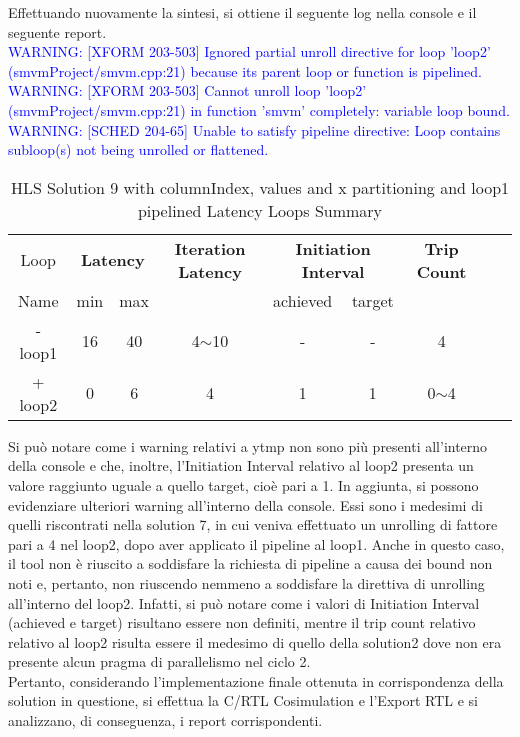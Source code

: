 

Effettuando nuovamente la sintesi, si ottiene il seguente log nella console e il seguente report.
\\
\textcolor{blue}{WARNING: [XFORM 203-503] Ignored partial unroll directive for loop 'loop2' (smvmProject/smvm.cpp:21) because its parent loop or function is pipelined.}
\\
\textcolor{blue}{WARNING: [XFORM 203-503] Cannot unroll loop 'loop2' (smvmProject/smvm.cpp:21) in function 'smvm' completely: variable loop bound.}
\\
\textcolor{blue}{WARNING: [SCHED 204-65] Unable to satisfy pipeline directive: Loop contains subloop(s) not being unrolled or flattened.}
\\
\begin{table}[H]
	\centering
	\begin{tabular}{|c|c|c|c|c|c|c|c|c|}
		\hline
		\multicolumn{1}{|c|}{Loop} & \multicolumn{2}{|c|}{\textbf{Latency}} & \multicolumn{1}{c|}{\textbf{Iteration Latency}} & \multicolumn{2}{c|}{\textbf{Initiation Interval}} & \multicolumn{1}{c|}{\textbf{Trip Count}}  \\
		Name & min & max &  & achieved & target &  \\
		\hline
		- loop1 & 16 & 40 & 4$\sim$10 & - & - & 4 \\
		+ loop2 & 0 & 6 & 4 & 1 & 1 & 0$\sim$4 \\
		\hline
	\end{tabular}
	\caption{HLS Solution 9 with columnIndex, values and x partitioning and loop1 pipelined Latency Loops Summary}
	\label{tab:hls-solution-9-columnindex-values-partitioning-loop-summary}
\end{table}

Si può notare come i warning relativi a ytmp non sono più presenti all'interno della console e che, inoltre, l'Initiation Interval relativo al loop2 presenta un valore raggiunto uguale a quello target, cioè pari a 1. In aggiunta, si possono evidenziare ulteriori warning all'interno della console. Essi sono i medesimi di quelli riscontrati nella solution 7, in cui veniva effettuato un unrolling di fattore pari a 4 nel loop2, dopo aver applicato il pipeline al loop1. Anche in questo caso, il tool non è riuscito a soddisfare la richiesta di pipeline a causa dei bound non noti e, pertanto, non riuscendo nemmeno a soddisfare la direttiva di unrolling all'interno del loop2. Infatti, si può notare come i valori di Initiation Interval (achieved e target) risultano essere non definiti, mentre il trip count relativo relativo al loop2 risulta essere il medesimo di quello della solution2 dove non era presente alcun pragma di parallelismo nel ciclo 2.
\\
Pertanto, considerando l'implementazione finale ottenuta in corrispondenza della solution in questione, si effettua la C/RTL Cosimulation e l'Export RTL e si analizzano, di conseguenza, i report corrispondenti.

